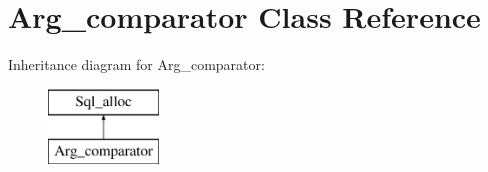 \hypertarget{classArg__comparator}{}\section{Arg\+\_\+comparator Class Reference}
\label{classArg__comparator}
Inheritance diagram for Arg\+\_\+comparator\+:\begin{figure}[H]
\begin{center}
\leavevmode
\includegraphics[height=2.000000cm]{classArg__comparator}
\end{center}
\end{figure}
